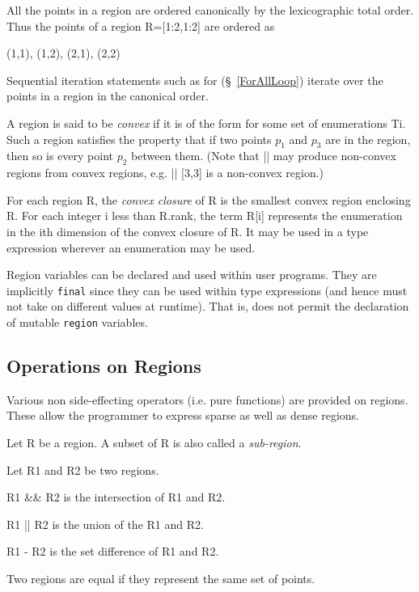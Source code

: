 All the points in a region are ordered canonically by the lexicographic total order. Thus the points of a region {\cf R=[1:2,1:2]} are ordered as 
\begin{x10}
  (1,1), (1,2), (2,1), (2,2)
\end{x10}
Sequential iteration statements such as {\cf for} (\S~\ref{ForAllLoop})
iterate over the points in a region in the canonical order.

A region is said to be {\em convex} if it is of
the form {\cf [T1,..., Tk]} for some set of enumerations {\cf Ti}. Such a
region satisfies the property that if two points $p_1$ and $p_3$ are
in the region, then so is every point $p_2$ between them. (Note that
{\cf ||} may produce non-convex regions from convex regions, e.g.{}
{\cf [1,1] || [3,3]} is a non-convex region.)

For each region {\cf R}, the {\em convex closure} of {\cf R} is the
smallest convex region enclosing {\cf R}.  For each integer {\cf i}
less than {\cf R.rank}, the term {\cf R[i]} represents the enumeration
in the {\cf i}th dimension of the convex closure of {\cf R}. It may be
used in a type expression wherever an enumeration may be used.

Region variables can be declared and used within user programs. They
are implicitly {\tt final} since they can be used within type
expressions (and hence must not take on different values at
runtime). That is, \Xten{} does not permit the declaration of mutable
{\tt region} variables.

\subsection{Operations on Regions}
Various non side-effecting operators (i.e.{} pure functions) are
provided on regions. These allow the programmer to express sparse as
well as dense regions.

Let {\cf R} be a region. A subset of {\cf R} is also called a {\em
sub-region}.

Let {\cf R1} and {\cf R2} be two regions.

{\cf R1 \&\& R2} is the intersection of {\cf R1} and {\cf R2}.

{\cf R1 || R2} is the union of the {\cf R1} and {\cf R2}.

{\cf R1 - R2} is the set difference of {\cf R1} and {\cf R2}.

Two regions are equal if they represent the same set of
points.


